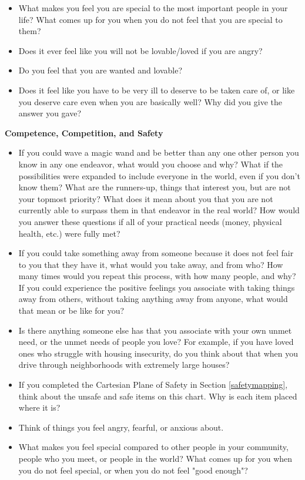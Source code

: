 \documentclass[12pt,letterpaper]{article}
\begin{document}
\begin{itemize}
    \item What makes you feel you are special to the most important people in your life? What comes up for you when you do not feel that you are special to them?
    \item Does it ever feel like you will not be lovable/loved if you are angry?
    \item Do you feel that you are wanted and lovable?
    \item Does it feel like you have to be very ill to deserve to be taken care of, or like you deserve care even when you are basically well?  Why did you give the answer you gave?
\end{itemize}

\noindent \textbf{Competence, Competition, and Safety}
\begin{itemize}
    \item If you could wave a magic wand and be better than any one other person you know in any one endeavor, what would you choose and why? What if the possibilities were expanded to include everyone in the world, even if you don't know them? What are the runners-up, things that interest you, but are not your topmost priority? What does it mean about you that you are not currently able to surpass them in that endeavor in the real world? How would you answer these questions if all of your practical needs (money, physical health, etc.) were fully met?
    \item If you could take something away from someone because it does not feel fair to you that they have it, what would you take away, and from who? How many times would you repeat this process, with how many people, and why? If you could experience the positive feelings you associate with taking things away from others, without taking anything away from anyone, what would that mean or be like for you?
    \item Is there anything someone else has that you associate with your own unmet need, or the unmet needs of people you love? For example, if you have loved ones who struggle with housing insecurity, do you think about that when you drive through neighborhoods with extremely large houses?
    \item If you completed the Cartesian Plane of Safety in Section \ref{safetymapping}, think about the unsafe and safe items on this chart. Why is each item placed where it is?
    \item Think of things you feel angry, fearful, or anxious about. 
    \item What makes you feel special compared to other people in your community, people who you meet, or people in the world? What comes up for you when you do not feel special, or when you do not feel "good enough"?

\end{itemize}
\end{document}
